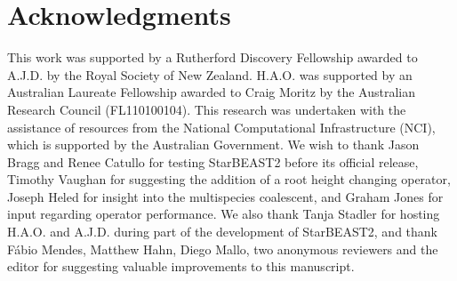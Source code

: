 \documentclass[12pt]{article}
\begin{document}
\section{Acknowledgments}

This work was supported by a Rutherford Discovery Fellowship awarded to A.J.D.
by the Royal Society of New Zealand. H.A.O. was supported by an Australian
Laureate Fellowship awarded to Craig Moritz by the Australian Research Council
(FL110100104). This research was undertaken with the assistance of resources
from the National Computational Infrastructure (NCI), which is supported by
the Australian Government. We wish to thank Jason Bragg and Renee Catullo for
testing StarBEAST2 before its official release, Timothy Vaughan for suggesting
the addition of a root height changing operator, Joseph Heled for insight into
the multispecies coalescent, and Graham Jones for input regarding operator
performance. We also thank Tanja Stadler for hosting H.A.O. and A.J.D. during
part of the development of StarBEAST2, and thank F\'abio Mendes, Matthew Hahn,
Diego Mallo, two anonymous reviewers and the editor for suggesting valuable
improvements to this manuscript.



\end{document}
